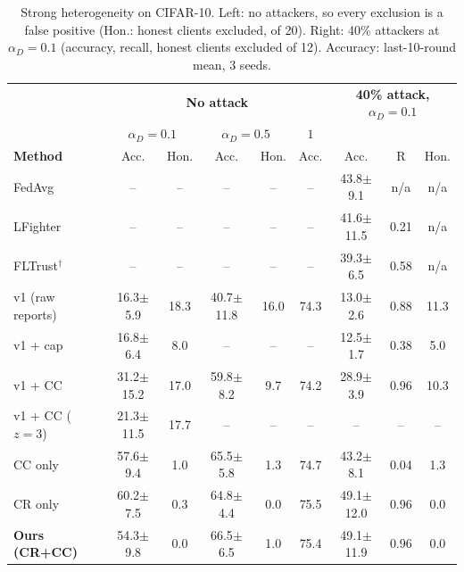 \begin{table}[t]
\centering
\caption{Strong heterogeneity on CIFAR-10. Left: no attackers, so every exclusion is a false positive (Hon.: honest clients excluded, of 20). Right: 40\% attackers at $\alpha_D{=}0.1$ (accuracy, recall, honest clients excluded of 12). Accuracy: last-10-round mean, 3 seeds.}
\label{tab:het}
\renewcommand{\arraystretch}{1.1}
\scriptsize
\setlength{\tabcolsep}{1.8pt}
\begin{tabular}{l|cc|cc|c||ccc}
\hline
& \multicolumn{5}{c||}{\textbf{No attack}} & \multicolumn{3}{c}{\textbf{40\% attack, $\alpha_D{=}0.1$}} \\
& \multicolumn{2}{c|}{$\alpha_D{=}0.1$} & \multicolumn{2}{c|}{$\alpha_D{=}0.5$} & $1$ & & & \\
\textbf{Method} & Acc. & Hon. & Acc. & Hon. & Acc. & Acc. & R & Hon. \\
\hline
FedAvg & -- & -- & -- & -- & -- & 43.8$\pm$9.1 & n/a & n/a \\
LFighter & -- & -- & -- & -- & -- & 41.6$\pm$11.5 & 0.21 & n/a \\
FLTrust$^\dagger$ & -- & -- & -- & -- & -- & 39.3$\pm$6.5 & 0.58 & n/a \\
\hline
v1 (raw reports) & 16.3$\pm$5.9 & 18.3 & 40.7$\pm$11.8 & 16.0 & 74.3 & 13.0$\pm$2.6 & 0.88 & 11.3 \\
\quad v1 + cap & 16.8$\pm$6.4 & 8.0 & -- & -- & -- & 12.5$\pm$1.7 & 0.38 & 5.0 \\
\quad v1 + CC & 31.2$\pm$15.2 & 17.0 & 59.8$\pm$8.2 & 9.7 & 74.2 & 28.9$\pm$3.9 & 0.96 & 10.3 \\
\quad v1 + CC ($z{=}3$) & 21.3$\pm$11.5 & 17.7 & -- & -- & -- & -- & -- & -- \\
\quad CC only & 57.6$\pm$9.4 & 1.0 & 65.5$\pm$5.8 & 1.3 & 74.7 & 43.2$\pm$8.1 & 0.04 & 1.3 \\
\quad CR only & 60.2$\pm$7.5 & 0.3 & 64.8$\pm$4.4 & 0.0 & 75.5 & 49.1$\pm$12.0 & 0.96 & 0.0 \\
\textbf{Ours (CR+CC)} & 54.3$\pm$9.8 & 0.0 & 66.5$\pm$6.5 & 1.0 & 75.4 & 49.1$\pm$11.9 & 0.96 & 0.0 \\
\hline
\end{tabular}
\end{table}
